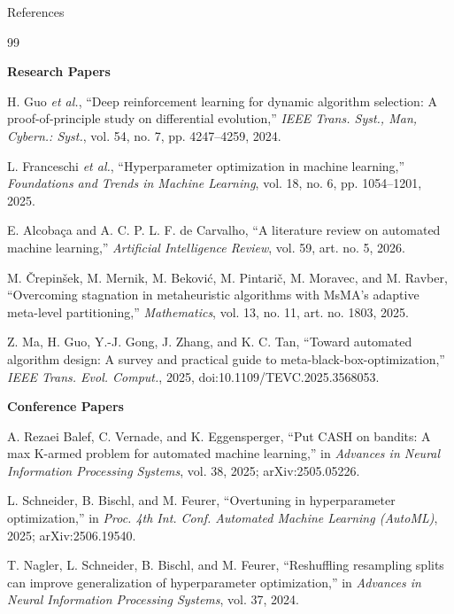 \documentclass[aspectratio=169, 11pt]{beamer}
\begin{document}
\begin{frame}[allowframebreaks]{References}
\fontsize{6.5}{8}\selectfont
\begin{thebibliography}{99}

\item[] \textbf{Research Papers}

 H. Guo \textit{et al.}, ``Deep reinforcement learning for dynamic algorithm selection: A proof-of-principle study on differential evolution,'' \textit{IEEE Trans. Syst., Man, Cybern.: Syst.}, vol. 54, no. 7, pp. 4247--4259, 2024.

 L. Franceschi \textit{et al.}, ``Hyperparameter optimization in machine learning,'' \textit{Foundations and Trends in Machine Learning}, vol. 18, no. 6, pp. 1054--1201, 2025.

 E. Alcoba\c{c}a and A. C. P. L. F. de Carvalho, ``A literature review on automated machine learning,'' \textit{Artificial Intelligence Review}, vol. 59, art. no. 5, 2026.

 M. \v{C}repin\v{s}ek, M. Mernik, M. Bekovi\'{c}, M. Pintari\v{c}, M. Moravec, and M. Ravber, ``Overcoming stagnation in metaheuristic algorithms with MsMA's adaptive meta-level partitioning,'' \textit{Mathematics}, vol. 13, no. 11, art. no. 1803, 2025.

 Z. Ma, H. Guo, Y.-J. Gong, J. Zhang, and K. C. Tan, ``Toward automated algorithm design: A survey and practical guide to meta-black-box-optimization,'' \textit{IEEE Trans. Evol. Comput.}, 2025, doi:10.1109/TEVC.2025.3568053.

\item[] \textbf{Conference Papers}

 A. Rezaei Balef, C. Vernade, and K. Eggensperger, ``Put CASH on bandits: A max K-armed problem for automated machine learning,'' in \textit{Advances in Neural Information Processing Systems}, vol. 38, 2025; arXiv:2505.05226.

 L. Schneider, B. Bischl, and M. Feurer, ``Overtuning in hyperparameter optimization,'' in \textit{Proc. 4th Int. Conf. Automated Machine Learning (AutoML)}, 2025; arXiv:2506.19540.

 T. Nagler, L. Schneider, B. Bischl, and M. Feurer, ``Reshuffling resampling splits can improve generalization of hyperparameter optimization,'' in \textit{Advances in Neural Information Processing Systems}, vol. 37, 2024.


\end{thebibliography}
\end{frame}
\end{document}
